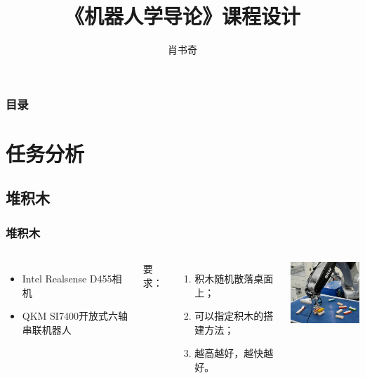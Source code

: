 \documentclass{beamer}
\title[《机器人学导论》课程设计]{《机器人学导论》课程设计} %
\author{肖书奇} %
\institute[18级自动化三班] %
{
\\ %
\medskip
}
\date{\zhtoday} %
\begin{document}
\begin{frame}
    \titlepage %
\end{frame}

\begin{frame}
    \frametitle{目录} %
    \tableofcontents %
\end{frame}



\section{任务分析}
\subsection{堆积木}

\begin{frame}
    \frametitle{堆积木}
    \begin{columns}[onlytextwidth,T]
        \column{\dimexpr\linewidth-50mm}
        \begin{itemize}
            \item Intel Realsense D455相机
            \item QKM SI7400开放式六轴串联机器人
        \end{itemize}
        \vspace*{2cm}
        \par 要求：
        \begin{enumerate}
            \item 积木随机散落桌面上；
            \item 可以指定积木的搭建方法；
            \item 越高越好，越快越好。
        \end{enumerate}
        \column{45mm}
        \includegraphics[width=38mm]{试验.png}
    \end{columns}
\end{frame}
\end{document}
